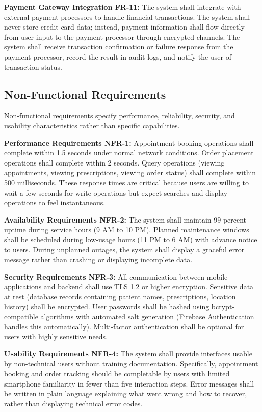 \documentclass[12pt,a4paper]{report}
\begin{document}
\textbf{Payment Gateway Integration FR-11:} The system shall integrate with external payment processors to handle financial transactions. The system shall never store credit card data; instead, payment information shall flow directly from user input to the payment processor through encrypted channels. The system shall receive transaction confirmation or failure response from the payment processor, record the result in audit logs, and notify the user of transaction status.

\subsection{Non-Functional Requirements}

Non-functional requirements specify performance, reliability, security, and usability characteristics rather than specific capabilities.

\textbf{Performance Requirements NFR-1:} Appointment booking operations shall complete within 1.5 seconds under normal network conditions. Order placement operations shall complete within 2 seconds. Query operations (viewing appointments, viewing prescriptions, viewing order status) shall complete within 500 milliseconds. These response times are critical because users are willing to wait a few seconds for write operations but expect searches and display operations to feel instantaneous.

\textbf{Availability Requirements NFR-2:} The system shall maintain 99 percent uptime during service hours (9 AM to 10 PM). Planned maintenance windows shall be scheduled during low-usage hours (11 PM to 6 AM) with advance notice to users. During unplanned outages, the system shall display a graceful error message rather than crashing or displaying incomplete data.

\textbf{Security Requirements NFR-3:} All communication between mobile applications and backend shall use TLS 1.2 or higher encryption. Sensitive data at rest (database records containing patient names, prescriptions, location history) shall be encrypted. User passwords shall be hashed using bcrypt-compatible algorithms with automated salt generation (Firebase Authentication handles this automatically). Multi-factor authentication shall be optional for users with highly sensitive needs.

\textbf{Usability Requirements NFR-4:} The system shall provide interfaces usable by non-technical users without training documentation. Specifically, appointment booking and order tracking should be completable by users with limited smartphone familiarity in fewer than five interaction steps. Error messages shall be written in plain language explaining what went wrong and how to recover, rather than displaying technical error codes.
\end{document}
